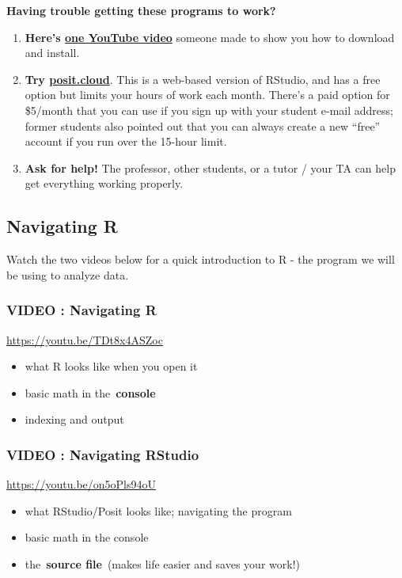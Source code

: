 \documentclass[
  letterpaper,
  DIV=11,
  numbers=noendperiod,
  oneside]{scrreprt}
\begin{document}
\textbf{Having trouble getting these programs to work?}

\begin{enumerate}
\def\labelenumi{\arabic{enumi}.}
\item
  \textbf{Here's \href{https://www.youtube.com/watch?v=0Qu7Jg1Jw5A}{one
  YouTube video}} someone made to show you how to download and install.
\item
  \textbf{Try \href{https://posit.cloud}{posit.cloud}}. This is a
  web-based version of RStudio, and has a free option but limits your
  hours of work each month. There's a paid option for \$5/month that you
  can use if you sign up with your student e-mail address; former
  students also pointed out that you can always create a new ``free''
  account if you run over the 15-hour limit.
\item
  \textbf{Ask for help!} The professor, other students, or a tutor /
  your TA can help get everything working properly.
\end{enumerate}

\subsection{Navigating R}\label{navigating-r}

Watch the two videos below for a quick introduction to R - the program
we will be using to analyze data.

\subsubsection{VIDEO : Navigating R}\label{video-navigating-r}

\url{https://youtu.be/TDt8x4ASZoc}

\begin{itemize}
\item
  what R looks like when you open it
\item
  basic math in the~\textbf{console}
\item
  indexing and output
\end{itemize}

\subsubsection{VIDEO : Navigating
RStudio}\label{video-navigating-rstudio}

\url{https://youtu.be/on5oPls94oU}

\begin{itemize}
\item
  what RStudio/Posit looks like; navigating the program
\item
  basic math in the console
\item
  the~\textbf{source file}~(makes life easier and saves your work!)
\end{itemize}
\end{document}
